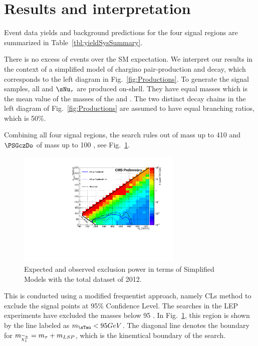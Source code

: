 \section{Results and interpretation}
\label{sect:stat}
Event data yields and background predictions for the four signal regions are summarized in Table~\ref{tbl:yieldSysSummary}.

There is no excess of events over the SM expectation.  We interpret our results in the context
of a simplified model of chargino pair-production and decay, which corresponds to the left
diagram in Fig.~\ref{fig:Productions}. To generate the signal samples, all  \sTau and $\sNu_{\tau}$ 
are produced  on-shell. They have equal masses which is the mean value of the masses of the \chione   and \PSGczDo.
The two distinct decay chains in the left diagram of Fig.~\ref{fig:Productions} are assumed to have equal branching ratios, which is 50\%.

Combining all four signal regions,
the search rules out \chione of mass up to 410 \GeV and  $\PSGczDo$ of mass up to 100 \GeV,
see Fig.~\ref{fig:limit_final}.
\begin{linenomath}
\begin{figure}[h]
\centering
\includegraphics[width=0.7\textwidth,keepaspectratio=true]{StatisticsFig/Exclusion4Bins.pdf}
\caption{Expected and observed exclusion power in terms of Simplified Models
with the total dataset of 2012. 
}
\label{fig:limit_final}
\end{figure}
\end{linenomath}
This is conducted using a modified frequentist approach, namely CLs method \cite{read:CLs} to 
exclude the signal points at 95\% Confidence Level.
The \sTau searches in the LEP experiments \cite{lepsusy} have excluded the masses below 95 \GeV. In Fig.~\ref{fig:limit_final}, 
this region is shown by the line labeled as $m_{\sTau} < 95 GeV$. The diagonal line denotes the boundary for $m_{\widetilde{\chi}^{\pm}_1} = m_{\tau} + m_{LSP}$, which is 
the kinemtical boundary of the search.



